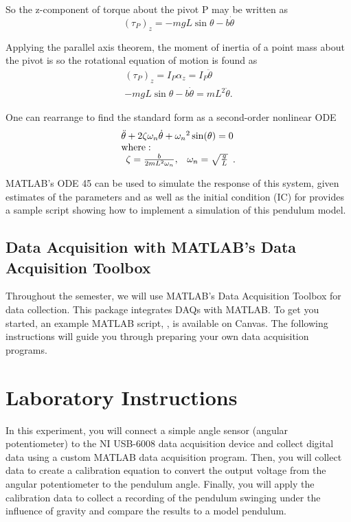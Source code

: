 \documentclass{article}
\begin{document}
So the z-component of torque about the pivot P  may be written as
\begin{equation}
    {\left( {{\tau _P}} \right)_z} =  - mgL\sin \theta  - b\dot \theta 
\end{equation}

Applying the parallel axis theorem, the moment of inertia of a point mass about the pivot is   so the rotational equation of motion is found as 
\begin{equation}
\begin{array}{l}
{\left( {{\tau _P}} \right)_z} = {I_P}{\alpha _z} = {I_P}\ddot \theta \\
 - mgL\sin \theta  - b\dot \theta  = m{L^2}\ddot \theta .
\end{array}
\end{equation}

One can rearrange to find the standard form as a second-order nonlinear ODE
\begin{equation}
\begin{array}{l}
\ddot \theta  + 2\zeta {\omega _n}\dot \theta  + {\omega _n}^2\sin (\theta ) = 0\\
{\rm{where:}}\\
\begin{array}{*{20}{c}}
{\zeta  = \frac{b}{{2m{L^2}{\omega _n}}},}&{{\omega _n} = \sqrt {\frac{g}{L}} }
\end{array}.
\end{array}
\end{equation}

MATLAB’s ODE 45 can be used to simulate the response of this system, given estimates of the parameters   and   as well as the initial condition (IC) for  provides a sample script showing how to implement a simulation of this pendulum model. 

\subsection{Data Acquisition with MATLAB’s Data Acquisition Toolbox}
Throughout the semester, we will use MATLAB’s Data Acquisition Toolbox for data collection. This package integrates DAQs with MATLAB. To get you started, an example MATLAB script, , is available on Canvas. The following instructions will guide you through preparing your own data acquisition programs.

\section{Laboratory Instructions}
In this experiment, you will connect a simple angle sensor (angular potentiometer) to the NI USB-6008 data acquisition device and collect digital data using a custom MATLAB data acquisition program. Then, you will collect data to create a calibration equation to convert the output voltage from the angular potentiometer to the pendulum angle. Finally, you will apply the calibration data to collect a recording of the pendulum swinging under the influence of gravity and compare the results to a model pendulum.
\end{document}
